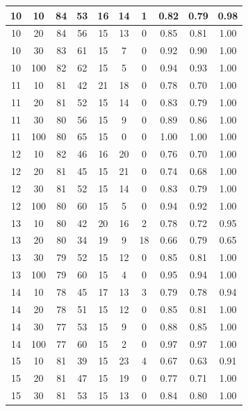 \begin{longtable}{ |c|c|c|c|c|c|c|c|c|c| }
            10 & 10 & 84 & 53 & 16 & 14 & 1 & 0.82 & 0.79 & 0.98 \\ \hline
            10 & 20 & 84 & 56 & 15 & 13 & 0 & 0.85 & 0.81 & 1.00 \\ \hline
            10 & 30 & 83 & 61 & 15 & 7 & 0 & 0.92 & 0.90 & 1.00 \\ \hline
            10 & 100 & 82 & 62 & 15 & 5 & 0 & 0.94 & 0.93 & 1.00 \\ \hline
            11 & 10 & 81 & 42 & 21 & 18 & 0 & 0.78 & 0.70 & 1.00 \\ \hline
            11 & 20 & 81 & 52 & 15 & 14 & 0 & 0.83 & 0.79 & 1.00 \\ \hline
            11 & 30 & 80 & 56 & 15 & 9 & 0 & 0.89 & 0.86 & 1.00 \\ \hline
            11 & 100 & 80 & 65 & 15 & 0 & 0 & 1.00 & 1.00 & 1.00 \\ \hline
            12 & 10 & 82 & 46 & 16 & 20 & 0 & 0.76 & 0.70 & 1.00 \\ \hline
            12 & 20 & 81 & 45 & 15 & 21 & 0 & 0.74 & 0.68 & 1.00 \\ \hline
            12 & 30 & 81 & 52 & 15 & 14 & 0 & 0.83 & 0.79 & 1.00 \\ \hline
            12 & 100 & 80 & 60 & 15 & 5 & 0 & 0.94 & 0.92 & 1.00 \\ \hline
            13 & 10 & 80 & 42 & 20 & 16 & 2 & 0.78 & 0.72 & 0.95 \\ \hline
            13 & 20 & 80 & 34 & 19 & 9 & 18 & 0.66 & 0.79 & 0.65 \\ \hline
            13 & 30 & 79 & 52 & 15 & 12 & 0 & 0.85 & 0.81 & 1.00 \\ \hline
            13 & 100 & 79 & 60 & 15 & 4 & 0 & 0.95 & 0.94 & 1.00 \\ \hline
            14 & 10 & 78 & 45 & 17 & 13 & 3 & 0.79 & 0.78 & 0.94 \\ \hline
            14 & 20 & 78 & 51 & 15 & 12 & 0 & 0.85 & 0.81 & 1.00 \\ \hline
            14 & 30 & 77 & 53 & 15 & 9 & 0 & 0.88 & 0.85 & 1.00 \\ \hline
            14 & 100 & 77 & 60 & 15 & 2 & 0 & 0.97 & 0.97 & 1.00 \\ \hline
            15 & 10 & 81 & 39 & 15 & 23 & 4 & 0.67 & 0.63 & 0.91 \\ \hline
            15 & 20 & 81 & 47 & 15 & 19 & 0 & 0.77 & 0.71 & 1.00 \\ \hline
            15 & 30 & 81 & 53 & 15 & 13 & 0 & 0.84 & 0.80 & 1.00 \\ \hline

\end{longtable}
